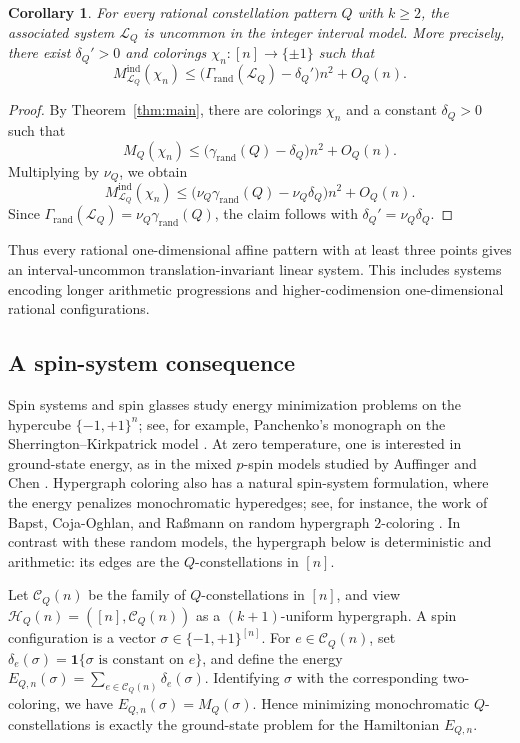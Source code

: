 \documentclass[twoside,12pt]{article}
\newcommand{\rand}{\mathrm{rand}}
\newcommand{\1}{\mathbf 1}
\newtheorem{corollary}[theorem]{Corollary}
\begin{document}
\begin{corollary}\label{cor:interval-system-uncommon}
For every rational constellation pattern \(Q\) with \(k\ge2\), the associated
system \(\mathcal L_Q\) is uncommon in the integer interval model.  More
precisely, there exist \(\delta_Q'>0\) and colorings
\(\chi_n:[n]\to\{\pm1\}\) such that
\[
M_{\mathcal L_Q}^{\mathrm{ind}}(\chi_n)
\le
\bigl(\Gamma_{\rand}(\mathcal L_Q)-\delta_Q'\bigr)n^2+O_Q(n).
\]
\end{corollary}

\begin{proof}
By Theorem~\ref{thm:main}, there are colorings \(\chi_n\) and a constant
\(\delta_Q>0\) such that
\[
M_Q(\chi_n)
\le
\bigl(\gamma_{\rand}(Q)-\delta_Q\bigr)n^2+O_Q(n).
\]
Multiplying by \(\nu_Q\), we obtain
\[
M_{\mathcal L_Q}^{\mathrm{ind}}(\chi_n)
\le
\bigl(\nu_Q\gamma_{\rand}(Q)-\nu_Q\delta_Q\bigr)n^2+O_Q(n).
\]
Since \(\Gamma_{\rand}(\mathcal L_Q)=\nu_Q\gamma_{\rand}(Q)\), the claim
follows with \(\delta_Q'=\nu_Q\delta_Q\).
\end{proof}

Thus every rational one-dimensional affine pattern with at least three points
gives an interval-uncommon translation-invariant linear system.  This includes
systems encoding longer arithmetic progressions and higher-codimension
one-dimensional rational configurations.

\subsection{A spin-system consequence}
\label{subsec:spin-system}

Spin systems and spin glasses study energy minimization problems on the
hypercube \(\{-1,+1\}^n\); see, for example, Panchenko's monograph on the
Sherrington--Kirkpatrick model \cite{Panchenko13Book}.  At zero temperature,
one is interested in ground-state energy, as in the mixed \(p\)-spin models
studied by Auffinger and Chen \cite{AuffingerChen17}.  Hypergraph coloring
also has a natural spin-system formulation, where the energy penalizes
monochromatic hyperedges; see, for instance, the work of Bapst, Coja-Oghlan,
and Ra{\ss}mann on random hypergraph \(2\)-coloring
\cite{BapstCojaOghlanRassmann16}.  In contrast with these random models, the
hypergraph below is deterministic and arithmetic: its edges are the
\(Q\)-constellations in \([n]\).

Let \(\mathcal C_Q(n)\) be the family of \(Q\)-constellations in \([n]\), and
view $\mathcal H_Q(n)=([n],\mathcal C_Q(n))$
as a \((k+1)\)-uniform hypergraph.  A spin configuration is a vector
\(\sigma\in\{-1,+1\}^{[n]}\).  For \(e\in\mathcal C_Q(n)\), set
$\delta_e(\sigma)=\mathbf 1\{\sigma \text{ is constant on } e\}$,
and define the energy
$E_{Q,n}(\sigma)=\sum_{e\in\mathcal C_Q(n)}\delta_e(\sigma)$.
Identifying \(\sigma\) with the corresponding two-coloring, we have
\(E_{Q,n}(\sigma)=M_Q(\sigma)\).  Hence minimizing monochromatic
\(Q\)-constellations is exactly the ground-state problem for the Hamiltonian
\(E_{Q,n}\).
\end{document}
